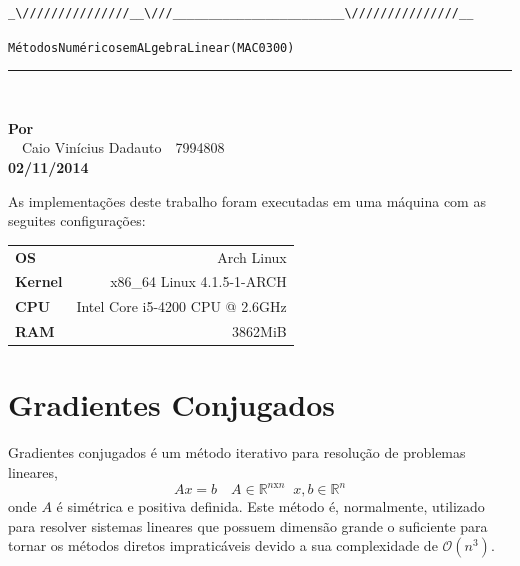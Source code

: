\documentclass [a4paper,10pt]{article}
\newcommand{\n}[1]{\textbf{#1}}
\begin{document}
{\begin{Verbatim}[fontsize=\small]
        _\///////////////__\///________________________\///////////////__
    \end{Verbatim}
    \begin{alltt}
        \hspace{1cm} Métodos Numéricos em ALgebra Linear (MAC0300)
    \end{alltt}
    \vspace{-3mm}
    \rule{\textwidth}{2pt}\\[-6mm]

    \begin{center}
        \n{Por}\\[-0.5mm]
        $\quad${\small Caio Vinícius Dadauto$\quad$7994808}\\[-2mm]
        {\tiny \n{02/11/2014}}\\[4mm]
    \end{center}

    \vspace{2cm}

    As implementações deste trabalho foram executadas em uma máquina com as seguites configurações:\\
    {\linespread{1}
        \begin{tabular}{l r}    
            \hspace{2.5cm}\n{\small OS}      & \small Arch Linux\\
            \hspace{2.5cm}\n{\small Kernel}  & \small x86\_64 Linux 4.1.5-1-ARCH\\
            \hspace{2.5cm}\n{\small CPU}     & \small Intel Core i5-4200 CPU @ 2.6GHz\\
            \hspace{2.5cm}\n{\small RAM}     & \small 3862MiB
        \end{tabular}
    }

    \section{Gradientes Conjugados}
    Gradientes conjugados é um método iterativo para resolução de problemas lineares,
    $$
    Ax = b\quad A \in \mathbb{R}^{n\mathrm{x}n}\;\;x,b \in \mathbb{R}^n
    $$
    onde $A$ é simétrica e positiva definida. Este método é, normalmente, utilizado para resolver sistemas lineares
    que possuem dimensão grande o suficiente para tornar os métodos diretos impraticáveis devido a sua complexidade
    de $\mathcal{O}(n^3)$.
    
}
\end{document}
